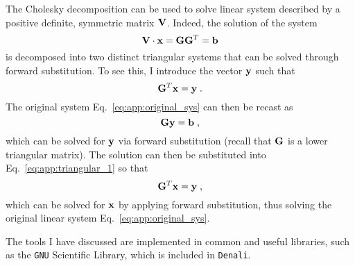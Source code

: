 The Cholesky decomposition can be used to solve linear system described by a positive definite, symmetric matrix $\mathbf{V}$. Indeed, the solution of the system
\begin{equation}
    \mathbf{V} \cdot \mathbf{x} = \mathbf{G} \mathbf{G}^T = \mathbf{b} 
    \label{eq:app:original_sys}
\end{equation}
is decomposed into two distinct triangular systems that can be solved through forward substitution. To see this, I introduce the vector $\mathbf{y}$ such that
\begin{equation}
    \mathbf{G}^T \mathbf{x} = \mathbf{y} \;.
    \label{eq:app:triangular_1}
\end{equation}
The original system Eq.~\eqref{eq:app:original_sys} can then be recast as
\begin{equation}
    \mathbf{G} \mathbf{y} = \mathbf{b} \;,
    \label{eq:app:triangular_2}
\end{equation}
which can be solved for $\mathbf{y}$ via forward substitution (recall that $\mathbf{G}$ is a lower triangular matrix). The solution can then be substituted into Eq.~\eqref{eq:app:triangular_1} so that
\begin{equation}
    \mathbf{G}^T \mathbf{x} = \mathbf{y} \;,
\end{equation}
which can be solved for $\mathbf{x}$ by applying forward substitution, thus solving the original linear system Eq.~\eqref{eq:app:original_sys}.%

The tools I have discussed are implemented in common and useful libraries, such as the \texttt{GNU} Scientific Library, which is included in \texttt{Denali}.